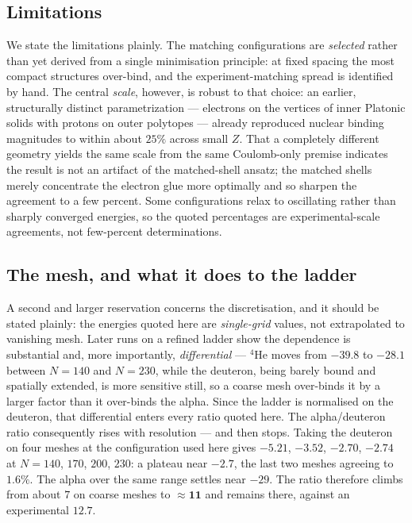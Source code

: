 \documentclass[11pt]{article}
\begin{document}
\subsection{Limitations}
\label{sec:limitations}

We state the limitations plainly. The matching configurations are \emph{selected} rather than
yet derived from a single minimisation principle: at fixed spacing the most compact structures
over-bind, and the experiment-matching spread is identified by hand. The central \emph{scale},
however, is robust to that choice: an earlier, structurally distinct parametrization --- electrons
on the vertices of inner Platonic solids with protons on outer polytopes --- already reproduced
nuclear binding magnitudes to within about $25\%$ across small $Z$. That a completely different
geometry yields the same scale from the same Coulomb-only premise indicates the result is not an
artifact of the matched-shell ansatz; the matched shells merely concentrate the electron glue more
optimally and so sharpen the agreement to a few percent. Some configurations relax
to oscillating rather than sharply converged energies, so the quoted percentages are
experimental-scale agreements, not few-percent determinations.

\subsection{The mesh, and what it does to the ladder}
\label{sec:mesh}

A second and larger reservation concerns the discretisation, and it should be stated plainly: the
energies quoted here are \emph{single-grid} values, not extrapolated to vanishing mesh. Later runs
on a refined ladder show the dependence is substantial and, more importantly, \emph{differential}
--- $^4$He moves from $-39.8$ to $-28.1$ between $N=140$ and $N=230$, while the deuteron, being
barely bound and spatially extended, is more sensitive still, so a coarse mesh over-binds it by a
larger factor than it over-binds the alpha. Since the ladder is normalised on the deuteron, that
differential enters every ratio quoted here. The alpha/deuteron ratio consequently rises with resolution --- and then stops. Taking
the deuteron on four meshes at the configuration used here gives $-5.21$, $-3.52$, $-2.70$, $-2.74$
at $N=140$, $170$, $200$, $230$: a plateau near $\mathbf{-2.7}$, the last two meshes agreeing to
$1.6\%$. The alpha over the same range settles near $-29$. The ratio therefore climbs from about
$7$ on coarse meshes to $\mathbf{{\approx}11}$ and remains there, against an experimental $12.7$.
\end{document}
